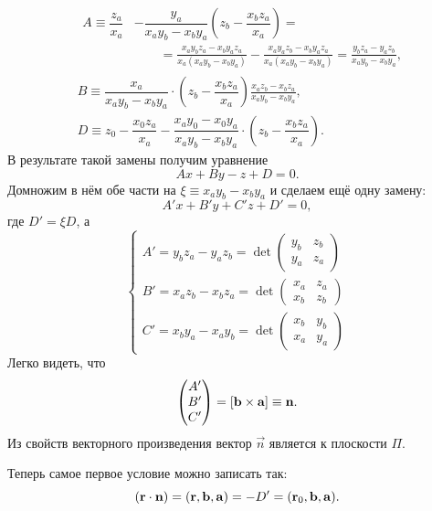 \begin{align*}
&
\begin{aligned}
	A \equiv  \dfrac{z_a}{x_a} &- \dfrac{y_a}{x_a y_b - x_b y_a} \left( z_b - \dfrac{x_b z_a}{x_a} \right) = \\
	&\quad\quad= \frac{x_a y_b z_a - x_b y_a z_a}{x_a (x_a y_b - x_b y_a)} - \frac{x_a y_a z_b - x_b y_a z_a}{x_a (x_a y_b - x_b y_a)} = \frac{y_b z_a - y_a z_b}{x_a y_b - x_b y_a},
\end{aligned}\\
&
B \equiv \dfrac{x_a}{x_a y_b - x_b y_a} \cdot \left( z_b - \dfrac{x_b z_a}{x_a} \right) 
\frac{x_a z_b - x_b z_a}{x_a y_b - x_b y_a},\\
&
D \equiv z_0 - \dfrac{x_0 z_a}{x_a} - \dfrac{x_a y_0 - x_0 y_a}{x_a y_b - x_b y_a} \cdot \left( z_b - \dfrac{x_b z_a}{x_a} \right).
\end{align*}
В результате такой замены получим уравнение
\begin{equation}
Ax + By - z + D = 0.
\end{equation}
Домножим в нём обе части на $\xi \equiv x_a y_b - x_b y_a$ и сделаем ещё одну замену:
\begin{equation*}
A'x + B'y + C'z + D' = 0,
\end{equation*}
где $D' = \xi D$, а
\begin{equation*}
\begin{cases}
	A' = y_b z_a - y_a z_b = \det
	\begin{pmatrix}
		y_b & z_b\\
		y_a & z_a
	\end{pmatrix}\\[1pc]
	B' = x_a z_b - x_b z_a = \det
	\begin{pmatrix}
		x_a & z_a\\
		x_b & z_b
	\end{pmatrix}\\[1pc]
	C' = x_b y_a - x_a y_b = \det
	\begin{pmatrix}
		x_b & y_b\\
		x_a & y_a
	\end{pmatrix}
\end{cases}
\end{equation*}
Легко видеть, что
\begin{equation}
\begin{pmatrix}
	A'\\
	B'\\
	C'
\end{pmatrix} =
\left[\mathbf{b} \times \mathbf{a}\right] \equiv \mathbf{n}.
\end{equation}
Из свойств векторного произведения вектор $\vec n$ является  к плоскости $\Pi$.

Теперь  самое первое условие можно записать так:
\begin{equation}
\left(\mathbf{r} \cdot \mathbf{n}\right) = \left( \mathbf{r}, \mathbf{b}, \mathbf{a} \right) = -D' = (\mathbf{r}_0, \mathbf{b}, \mathbf{a}).
\end{equation}
